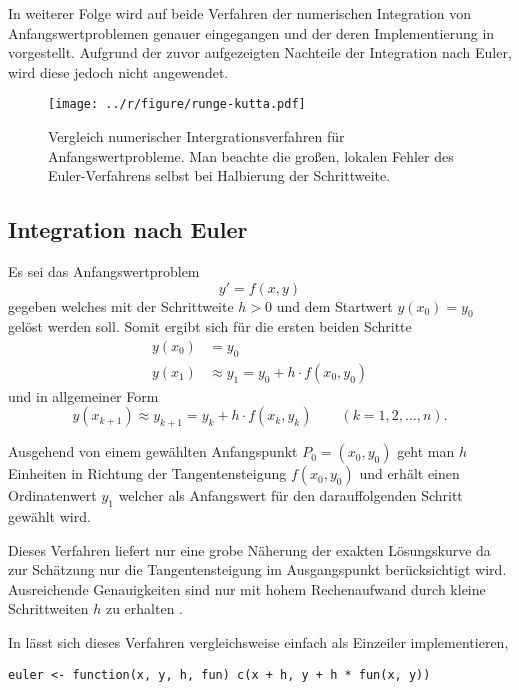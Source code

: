 In weiterer Folge wird auf beide Verfahren der numerischen Integration von Anfangswertproblemen genauer eingegangen und der deren Implementierung in \R{} vorgestellt. Aufgrund der zuvor aufgezeigten Nachteile der Integration nach Euler, wird diese jedoch nicht angewendet.

\begin{figure}
 \texttt{[image: ../r/figure/runge-kutta.pdf]}
 \caption[Vergleich numerischer Intergrationsverfahren für Anfangswertprobleme]{Vergleich numerischer Intergrationsverfahren für Anfangswertprobleme. Man beachte die großen, lokalen Fehler des Euler-Verfahrens selbst bei Halbierung der Schrittweite.}
 \label{fig:runge}
\end{figure}


\subsection{Integration nach Euler}
Es sei das Anfangswertproblem 
\begin{equation*}
  y'= f(x, y)
\end{equation*}
gegeben welches mit der Schrittweite $h>0$ und dem Startwert $y(x_0)=y_0$ gelöst werden soll. Somit ergibt sich für die ersten beiden Schritte
\begin{align*}
  y(x_0) &= y_0\\
  y(x_1) &\approx y_1 = y_0 + h \cdot f(x_0, y_0)
\end{align*}
und in allgemeiner Form
\begin{equation*}
  y(x_{k+1}) \approx y_{k+1} = y_k + h \cdot f(x_k, y_k) \qquad (k = 1, 2, \ldots, n).
\end{equation*}

Ausgehend von einem gewählten Anfangspunkt $P_0 = (x_0, y_0)$ geht man $h$ Einheiten in Richtung der Tangentensteigung $f(x_0, y_0)$ und erhält einen Ordinatenwert $y_1$ welcher als Anfangswert für den darauffolgenden Schritt gewählt wird. 

Dieses Verfahren liefert nur eine grobe Näherung der exakten Lösungskurve da zur Schätzung nur die Tangentensteigung im Ausgangspunkt berücksichtigt wird. Ausreichende Genauigkeiten sind nur mit hohem Rechenaufwand durch kleine Schrittweiten $h$ zu erhalten \cite{papula}.
 
In \R{} lässt sich dieses Verfahren vergleichsweise einfach als Einzeiler implementieren, 

\begin{lstlisting}[style=code]
euler <- function(x, y, h, fun) c(x + h, y + h * fun(x, y))
\end{lstlisting}

